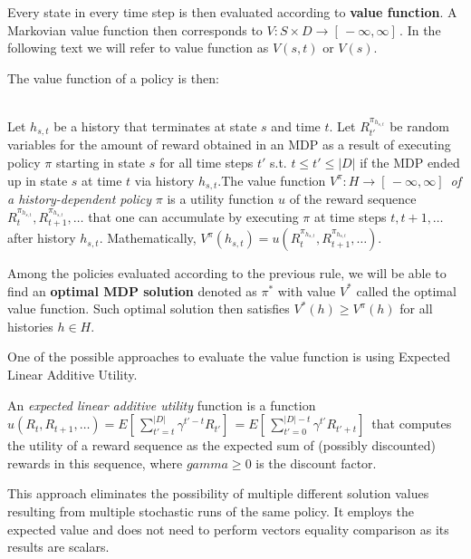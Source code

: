 Every state in every time step is then evaluated according to \textbf{value function}. A Markovian value function then corresponds to $ V: S \times D 
\rightarrow [ \,-\infty, \infty] \,$. In the following text we will refer to value function as $V(s, t)$ or $V(s)$.

The value function of a policy is then: \\ \\

\begin{definition}
Let $h_{s,t}$ be a history that terminates at state $s$ and time $t$. Let $R^{\pi_{h_{s,t}}}_{t'}$ be random variables for the amount of reward obtained in an MDP as a result of executing policy $\pi$ starting in state $s$ for all time steps $t'$ s.t. $t \leqslant t' \leqslant |D|$ if the MDP ended up in state $s$ at time $t$ via history $h_{s,t}$.The value function $V^{\pi}: H \rightarrow [ \,−\infty,\infty] \,$ \textit{of a history-dependent policy} $\pi$ is a utility function $u$ of the reward sequence $R^{\pi_{h_{s,t}}}_t, R^{\pi_{h_{s,t}}}_{t+1}, \ldots$ that one can accumulate by executing $\pi$ at time steps $t, t + 1,\ldots$  after history $h_{s,t}$. Mathematically, $V^{\pi} (h_{s,t}) = u(R^{\pi_{h_{s,t}}}_t , R^{\pi_{h_{s,t}}}_{t+1}, \ldots)$.
\end{definition}

Among the policies evaluated according to the previous rule, we will be able to find an \textbf{optimal MDP solution} denoted as $\pi^*$ with value $V^*$ called the optimal value function. Such optimal solution then satisfies $V^{*} (h) \geqslant V^{\pi} (h)$ for all histories $h \in H$.

One of the possible approaches to evaluate the value function is using Expected Linear Additive Utility.
\\
\begin{definition}
An \textit{expected linear additive utility} function is a function $u(R_t, R_{t+1}, \ldots) = E[ \,\sum_{t'=t}^{|D|} \gamma ^{t'−t} R_{t'}] \, = E[ \,\sum_{t'=0}^{|D|-t} \gamma^{t'} R_{t'+t}] \,$ that computes the utility of a
reward sequence as the expected sum of (possibly discounted) rewards in this sequence, where $gamma \geqslant 0$
is the discount factor.
\end{definition}

This approach eliminates the possibility of multiple different solution values resulting from multiple stochastic runs of the same policy. It employs the expected value and does not need to perform vectors equality comparison as its results are scalars.

